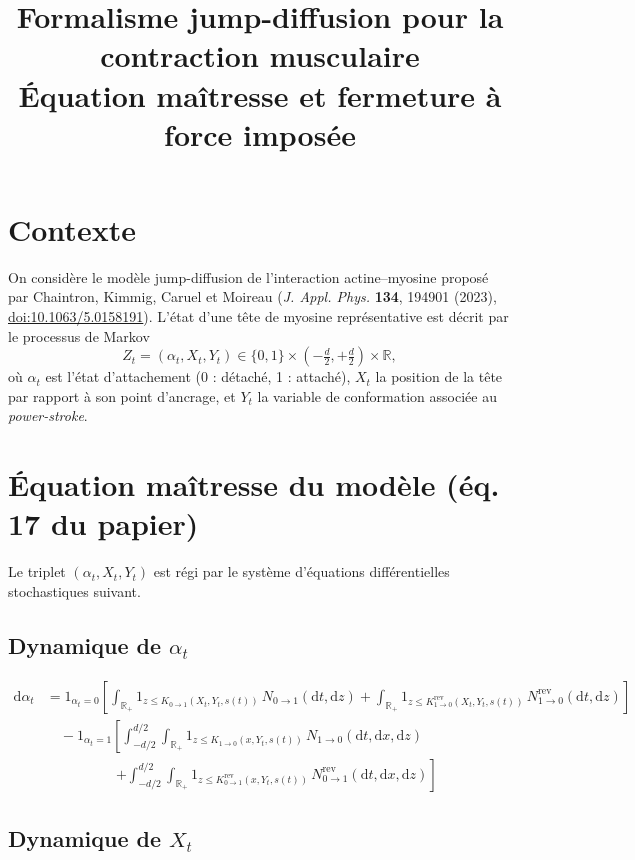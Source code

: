 \documentclass[11pt,a4paper]{article}
\title{Formalisme jump-diffusion pour la contraction musculaire \\
\large Équation maîtresse et fermeture à force imposée}
\author{}
\date{}
\newcommand{\dd}{\mathrm{d}}
\newcommand{\R}{\mathbb{R}}
\newcommand{\indic}[1]{\mathrm{1}_{#1}}
\begin{document}
\maketitle

\section{Contexte}

On considère le modèle jump-diffusion de l'interaction actine--myosine
proposé par Chaintron, Kimmig, Caruel et Moireau
(\emph{J. Appl. Phys.} \textbf{134}, 194901 (2023),
\href{https://doi.org/10.1063/5.0158191}{doi:10.1063/5.0158191}).
L'état d'une tête de myosine représentative est décrit par le processus
de Markov
\[
Z_t = (\alpha_t, X_t, Y_t) \in \{0,1\} \times \left(-\tfrac{d}{2}, +\tfrac{d}{2}\right) \times \R,
\]
où $\alpha_t$ est l'état d'attachement (0 : détaché, 1 : attaché),
$X_t$ la position de la tête par rapport à son point d'ancrage, et
$Y_t$ la variable de conformation associée au \emph{power-stroke}.

\section{Équation maîtresse du modèle (éq. 17 du papier)}

Le triplet $(\alpha_t, X_t, Y_t)$ est régi par le système d'équations
différentielles stochastiques suivant.

\subsection*{Dynamique de $\alpha_t$}

\begin{align*}
\dd\alpha_t
&= \indic{\alpha_t=0}\left[
\int_{\R_+} \indic{z \le K_{0\to1}(X_t,Y_t,s(t))}\, N_{0\to1}(\dd t,\dd z)
+ \int_{\R_+} \indic{z \le K^{\mathrm{rev}}_{1\to0}(X_t,Y_t,s(t))}\, N^{\mathrm{rev}}_{1\to0}(\dd t,\dd z)
\right] \\[1mm]
&\quad - \indic{\alpha_t=1}\left[
\int_{-d/2}^{d/2}\!\!\int_{\R_+} \indic{z \le K_{1\to0}(x,Y_t,s(t))}\, N_{1\to0}(\dd t,\dd x,\dd z) \right.\\
&\qquad\qquad\quad \left. + \int_{-d/2}^{d/2}\!\!\int_{\R_+} \indic{z \le K^{\mathrm{rev}}_{0\to1}(x,Y_t,s(t))}\, N^{\mathrm{rev}}_{0\to1}(\dd t,\dd x,\dd z)
\right]
\end{align*}

\subsection*{Dynamique de $X_t$}
\end{document}
